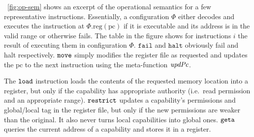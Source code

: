 \documentclass{llncs}
\newcommand{\update}[2]{[#1 \mapsto #2]}
\newcommand{\sem}[1]{\left\llbracket #1 \right\rrbracket}
\newcommand{\var}[1]{\mathit{#1}}
\newcommand{\lv}{\var{r}}
\newcommand{\gl}{\var{g}}
\newcommand{\pcreg}{\mathrm{pc}}
\newcommand{\addr}{\var{a}}
\newcommand{\start}{\var{b}}
\newcommand{\addrend}{\var{e}}
\newcommand{\perm}{\var{perm}}
\newcommand{\permp}{\var{permPair}}
\newcommand{\stdcap}[1][(\perm,\gl)]{\left(#1,\start,\addrend,\addr \right)}
\newcommand{\plainproj}[1]{\mathrm{#1}}
\newcommand{\memreg}[1][\Phi]{#1.\plainproj{reg}}
\newcommand{\updateHeap}[3][\Phi]{#1\update{\plainproj{mem}.#2}{#3}}
\newcommand{\updateReg}[3][\Phi]{#1\update{\plainproj{reg}.#2}{#3}}
\newcommand{\plainfun}[2]{
  \ifthenelse{\equal{#2}{}}
  {\mathit{#1}}
  {\mathit{#1}(#2)}
}
\newcommand{\updatePcPerm}[1]{\plainfun{updPcPerm}{#1}}
\newcommand{\stdUpdatePc}[1]{\plainfun{updPc}{#1}}
\newcommand{\refreg}[1]{#1}
\newcommand{\refheap}[1]{#1}
\newcommand{\zinstr}[1]{\mathtt{#1}}
\newcommand{\fail}{\zinstr{fail}}
\newcommand{\halt}{\zinstr{halt}}
\newcommand{\oneinstr}[2]{
  \ifthenelse{\equal{#2}{}}
  {\zinstr{#1}}
  {\zinstr{#1} \; #2}
}
\newcommand{\jmp}[1]{\oneinstr{jmp}{#1}}
\newcommand{\twoinstr}[3]{
  \ifthenelse{\equal{#2#3}{}}
  {\zinstr{#1}}
  {\zinstr{#1} \; #2 \; #3}
}
\newcommand{\restricttwo}[2]{\twoinstr{restrict}{#1}{#2}}
\newcommand{\geta}[2]{\twoinstr{geta}{#1}{#2}}
\newcommand{\move}[2]{\twoinstr{move}{#1}{#2}}
\newcommand{\store}[2]{\twoinstr{store}{#1}{#2}}
\newcommand{\load}[2]{\twoinstr{load}{#1}{#2}}
\newcommand{\plainperm}[1]{\textsc{#1}}
\newcommand{\readwrite}{\plainperm{rw}}
\newcommand{\rwx}{\plainperm{rwx}}
\newcommand{\readwritel}{\plainperm{rwl}}
\newcommand{\rwlx}{\plainperm{rwlx}}
\newcommand{\plainlocality}[1]{\mathrm{#1}}
\newcommand{\local}{\plainlocality{local}}
\begin{document}

\figurename~\ref{fig:op-sem} shows an excerpt of the operational semantics for a
few representative instructions. Essentially, a configuration $\Phi$ either
decodes and executes the instruction at $\memreg(\pcreg)$ if it is executable
and its address is in the valid range or otherwise fails. The table in the
figure shows for instructions $i$ the result of executing them in configuration
$\Phi$. $\fail$ and $\halt$ obviously fail and halt respectively. $\move{}{}$
simply modifies the register file as requested and updates the $\pcreg$ to the
next instruction using the meta-function $\stdUpdatePc{}$.

The $\load{}{}$ instruction loads the contents of the requested memory location
into a register, but only if the capability has appropriate authority (i.e.\
read permission and an appropriate range). $\restricttwo{}{}$ updates a
capability's permissions and global/local tag in the register file, but only if
the new permissions are weaker than the original. It also never turns local
capabilities into global ones. $\geta{}{}$ queries the current address of a
capability and stores it in a register.
\end{document}
